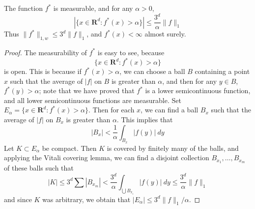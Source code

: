 \begin{theorem}
    The function $f^*$ is measurable, and for any $\alpha > 0$,
    \[ |\{ x \in \mathbf{R}^d: f^*(x) > \alpha \}| \leq \frac{3^d}{\alpha} \| f \|_1 \]
    Thus $\| f^* \|_{1,w} \leq 3^d \| f \|_1$, and $f^*(x) < \infty$ almost surely.
\end{theorem}
\begin{proof}
    The measurability of $f^*$ is easy to see, because
    \[ \{ x \in \mathbf{R}^d: f^*(x) > \alpha \} \]
    is open. This is because if $f^*(x) > \alpha$, we can choose a ball $B$ containing a point $x$ such that the average of $|f|$ on $B$ is greater than $\alpha$, and then for any $y \in B$, $f^*(y) > \alpha$; note that we have proved that $f^*$ is a lower semicontinuous function, and all lower semicontinuous functions are measurable. Set $E_\alpha = \{ x \in \mathbf{R}^d: f^*(x) > \alpha \}$. Then for each $x$, we can find a ball $B_x$ such that the average of $|f|$ on $B_x$ is greater than $\alpha$. This implies that
    \[ |B_x| < \frac{1}{\alpha} \int_{B_x} |f(y)|\ dy \]
    Let $K \subset E_\alpha$ be compact. Then $K$ is covered by finitely many of the balls, and applying the Vitali covering lemma, we can find a disjoint collection $B_{x_1}, \dots, B_{x_m}$ of these balls such that
    \[ |K| \leq 3^d \sum |B_{x_m}| < \frac{3^d}{\alpha} \int_{\bigcup B_{x_i}} |f(y)|\ dy \leq \frac{3^d}{\alpha} \|f\|_1 \]
    and since $K$ was arbitrary, we obtain that $|E_\alpha| \leq 3^d \| f \|_1/\alpha$.
\end{proof}

